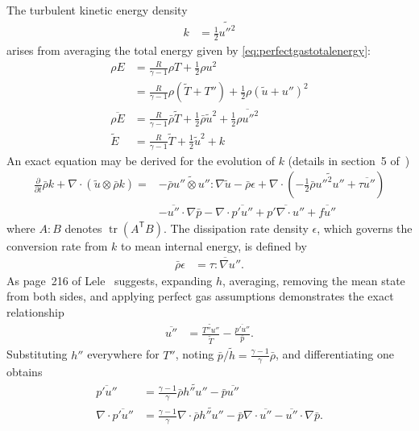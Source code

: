 \documentclass[letterpaper,11pt,nointlimits,reqno]{amsart}
\newcommand{\trans}[1]{{#1}^{\ensuremath{\mathsf{T}}}}
\DeclareMathOperator{\trace}{tr}
\begin{document}
The turbulent kinetic energy density
\begin{align}
  k &= \frac{1}{2}\widetilde{{u''}^2}
 \end{align}
arises from averaging the total energy given by
\eqref{eq:perfectgastotalenergy}:
\begin{align}
  \rho{} E
&=
  \frac{R}{\gamma-1} \rho{}T + \frac{1}{2}\rho{} u^{2}
\\
&=
  \frac{R}{\gamma-1} \rho{}\left( \tilde{T} + T'' \right)
+ \frac{1}{2}\rho{} \left( \tilde{u} + u'' \right)^2
\\
  \overline{\rho{}E}
&=
  \frac{R}{\gamma-1} \bar{\rho} \tilde{T}
+ \frac{1}{2}\bar{\rho} \tilde{u}^2
+ \frac{1}{2}\overline{\rho{}{u''}^2}
\\
  \tilde{E}
&=
  \frac{R}{\gamma-1} \tilde{T}
+ \frac{1}{2} \tilde{u}^2
+ k
\end{align}
An exact equation may be derived for the evolution of $k$ (details in section~5
of~\cite{OliverFANSModels2011})
\begin{align}
\label{eq:fanstke1}
    \frac{\partial{}}{\partial{}t}\bar{\rho}k
  + \nabla\cdot(\tilde{u}\otimes\bar{\rho}k)
 =
 &- \bar{\rho} \widetilde{u''\otimes{}u''} : \nabla\tilde{u}
  - \bar{\rho} \epsilon
  + \nabla\cdot\left(
        -\frac{1}{2}\bar{\rho}\widetilde{{u''}^{2}u''}
      + \overline{\tau{}u''}
    \right)
\\
 &- \overline{u''}\cdot\nabla\bar{p}
  - \nabla\cdot\overline{p' u''}
  + \overline{p' \nabla\cdot{}u''}
  + \overline{fu''}
\end{align}
where $A:B$ denotes $\trace \left(\trans{A} B\right)$. The dissipation rate
density $\epsilon$, which governs the conversion rate from $k$ to mean internal
energy, is defined by
\begin{align}
  \bar{\rho} \epsilon &= \overline{\tau : \nabla{}u''}
.
\end{align}
As page~216 of Lele~\cite{Lele1994Compressibility} suggests, expanding $h$,
averaging, removing the mean state from both sides, and applying perfect gas
assumptions demonstrates the exact relationship
\begin{align}
  \overline{u''}
&=
  \frac{\widetilde{T''u''}}{\tilde{T}} - \frac{\overline{p'u''}}{\bar{p}}
.
\end{align}
Substituting $h''$ everywhere for $T''$, noting $\bar{p}/\tilde{h} =
\frac{\gamma-1}{\gamma}\bar{\rho}$, and differentiating one obtains
\begin{align}
  \overline{p'u''}
&=
  \frac{\gamma-1}{\gamma} \bar{\rho} \widetilde{h''u''}
- \bar{p} \overline{u''}
\\
  \nabla\cdot \overline{p'u''}
&=
  \frac{\gamma-1}{\gamma} \nabla\cdot \bar{\rho} \widetilde{h''u''}
- \bar{p}\nabla\cdot\overline{u''}
- \overline{u''}\cdot\nabla{}\bar{p}
.
\end{align}
\end{document}
